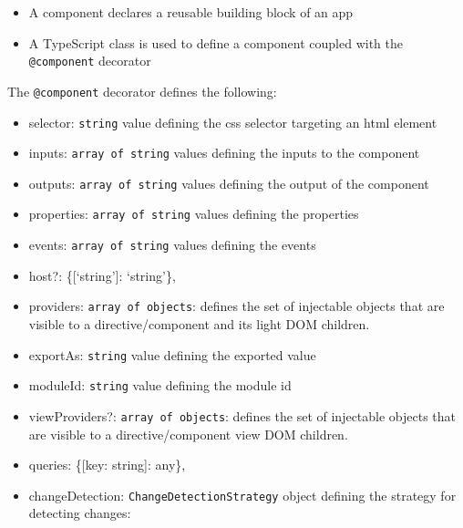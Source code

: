 \documentclass[12pt,]{article}
\providecommand{\tightlist}{%
  \setlength{\itemsep}{0pt}\setlength{\parskip}{0pt}}
\begin{document}
\begin{itemize}
\tightlist
\item
  A component declares a reusable building block of an app
\item
  A TypeScript class is used to define a component coupled with the
  \texttt{@component} decorator
\end{itemize}

The \texttt{@component} decorator defines the following:

\begin{itemize}
\item
  selector: \texttt{string} value defining the css selector targeting an
  html element
\item
  inputs: \texttt{array\ of\ string} values defining the inputs to the
  component
\item
  outputs: \texttt{array\ of\ string} values defining the output of the
  component
\item
  properties: \texttt{array\ of\ string} values defining the properties
\item
  events: \texttt{array\ of\ string} values defining the events
\item
  host?: \{{[}`string'{]}: `string'\},
\item
  providers: \texttt{array\ of\ objects}: defines the set of injectable
  objects that are visible to a directive/component and its light DOM
  children.
\item
  exportAs: \texttt{string} value defining the exported value
\item
  moduleId: \texttt{string} value defining the module id
\item
  viewProviders?: \texttt{array\ of\ objects}: defines the set of
  injectable objects that are visible to a directive/component view DOM
  children.
\item
  queries: \{{[}key: string{]}: any\},
\item
  changeDetection: \texttt{ChangeDetectionStrategy} object defining the
  strategy for detecting changes:


\end{itemize}
\end{document}
